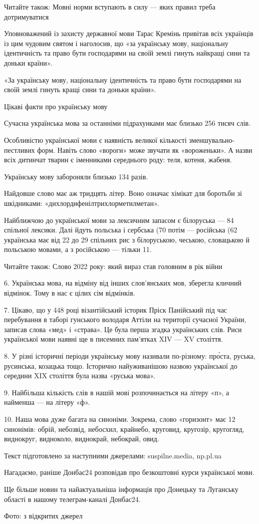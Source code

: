 Читайте також: Мовні норми вступають в силу — яких правил треба дотримуватися

Уповноважений із захисту державної мови Тарас Кремінь привітав всіх українців
із цим чудовим святом і наголосив, що «за українську мову, національну
ідентичність та право бути господарями на своїй землі гинуть найкращі сини та
доньки країни».

«За українську мову, національну ідентичність та право бути господарями на
своїй землі гинуть кращі сини та доньки країни».

Цікаві факти про українську мову

Сучасна українська мова за останніми підрахунками має близько 256 тисяч слів.

Особливістю української мови є наявність великої кількості
зменшувально-пестливих форм. Навіть слово «вороги» може звучати як
«вороженьки». А назви всіх дитинчат тварин є іменниками середнього роду:
теля, котеня, жабеня.

Українську мову забороняли близько 134 разів.

Найдовше слово має аж тридцять літер. Воно означає хімікат для боротьби зі шкідниками: «дихлордифенілтрихлорметилметан».

Найближчою до української мови за лексичним запасом є білоруська — 84%
спільної лексики. Далі йдуть польська і сербська (70%
потім — російська (62%
українська має від 22 до 29 спільних рис з білоруською, чеською, словацькою
й польською мовами, а з російською — тільки 11.

Читайте також: Слово 2022 року: який вираз став головним в рік війни

6. Українська мова, на відміну від інших слов’янських мов, зберегла кличний
відмінок. Тому в нас є цілих сім відмінків.

7. Цікаво, що у 448 році візантійський історик Пріск Панійський під час
перебування в таборі гунського володаря Аттіли на території сучасної України,
записав слова «мед» і «страва». Це була перша згадка українських слів. Риси
української мови наявні ще в писемних пам’ятках XIV — XV століття.

8. У різні історичні періоди українську мову називали по-різному: про́ста,
руська, русинська, козацька тощо. Історично найуживанішою назвою української до
середини XIX століття була назва «руська мова».

9. Найбільша кількість слів в нашій мові розпочинається на літеру «п», а
найменша — на літеру «ф».

10. Наша мова дуже багата на синоніми. Зокрема, слово «горизонт» має 12
синонімів: обрій, небозвід, небосхил, крайнебо, круговид, кругозір, кругогляд,
виднокруг, видноколо, виднокрай, небокрай, овид.

Текст підготовлено за наступними джерелами: suspilne.media, np.pl.ua

Нагадаємо, раніше Донбас24 розповідав про безкоштовні курси української мови.

Ще більше новин та найактуальніша інформація про Донецьку та Луганську області
в нашому телеграм-каналі Донбас24.

Фото: з відкритих джерел
